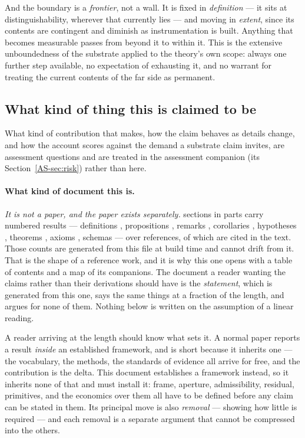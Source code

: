 \documentclass[11pt,a4paper]{article}
\theoremstyle{remark}\newtheorem{remark}[definition]{Remark}
\begin{document}
And the boundary is a \emph{frontier}, not a wall. It is fixed in \emph{definition} --- it sits at distinguishability, wherever that currently lies --- and moving in \emph{extent}, since its contents are contingent and diminish as instrumentation is built. Anything that becomes measurable passes from beyond it to within it. This is the extensive unboundedness of the substrate applied to the theory's own scope: always one further step available, no expectation of exhausting it, and no warrant for treating the current contents of the far side as permanent.

\subsection*{What kind of thing this is claimed to be}\label{sec:what-kind}

What kind of contribution that makes, how the claim behaves as details change, and how the
account scores against the demand a substrate claim invites, are assessment questions and are
treated in the assessment companion (its Section~\ref{AS-sec:risk}) rather than here.

\paragraph{What kind of document this is.} \emph{It is not a paper, and the paper exists separately.}
\nSections{} sections in \nParts{} parts carry \nResults{} numbered results --- definitions
\nDefinitions{}, propositions \nPropositions{}, remarks \nRemarks{}, corollaries \nCorollaries{},
hypotheses \nHypotheses{}, theorems \nTheorems{}, axioms \nAxioms{}, schemas \nSchemas{} --- over \nBibitems{} references,
of which \nCited{} are cited in the text. Those counts are generated from this file at build time and
cannot drift from it. That is the shape of a reference work, and it is why this one opens with a
table of contents and a map of its companions. The document a reader wanting the claims rather than
their derivations should have is the \emph{statement}, which is generated from this one, says the same
things at a fraction of the length, and argues for none of them. Nothing below is written on the assumption of a
linear reading.

A reader arriving at the length should know what sets it. A
normal paper reports a result \emph{inside} an established framework, and is short because it inherits
one --- the vocabulary, the methods, the standards of evidence all arrive for free, and the contribution
is the delta. This document establishes a framework instead, so it inherits none of that and must
install it: frame, aperture, admissibility, residual, primitives, and the economics over them all have
to be defined before any claim can be stated in them. Its principal move is also \emph{removal} ---
showing how little is required --- and each removal is a separate argument that cannot be compressed
into the others.
\end{document}
